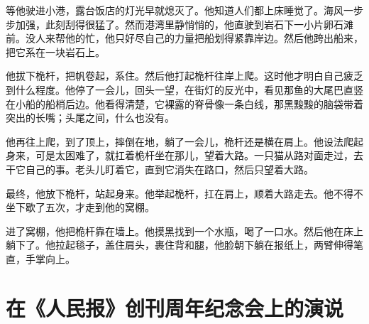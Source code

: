 \documentclass[12pt,UTF-8,openany]{ctexbook}
\begin{document}
\begin{large}
    等他驶进小港，露台饭店的灯光早就熄灭了。他知道人们都上床睡觉了。海风一步步加强，此刻刮得很猛了。然而港湾里静悄悄的，他直驶到岩石下一小片卵石滩前。没人来帮他的忙，他只好尽自己的力量把船划得紧靠岸边。然后他跨出船来，把它系在一块岩石上。
    
    他拔下桅杆，把帆卷起，系住。然后他打起桅杆往岸上爬。这时他才明白自己疲乏到什么程度。他停了一会儿，回头一望，在街灯的反光中，看见那鱼的大尾巴直竖在小船的船梢后边。他看得清楚，它裸露的脊骨像一条白线，那黑黢黢的脑袋带着突出的长嘴；头尾之间，什么也没有。
    
    他再往上爬，到了顶上，摔倒在地，躺了一会儿，桅杆还是横在肩上。他设法爬起身来，可是太困难了，就扛着桅杆坐在那儿，望着大路。一只猫从路对面走过，去干它自己的事。老头儿盯着它，直到它消失在路口，然后只望着大路。
    
    最终，他放下桅杆，站起身来。他举起桅杆，扛在肩上，顺着大路走去。他不得不坐下歇了五次，才走到他的窝棚。
    
    进了窝棚，他把桅杆靠在墙上。他摸黑找到一个水瓶，喝了一口水。然后他在床上躺下了。他拉起毯子，盖住肩头，裹住背和腿，他脸朝下躺在报纸上，两臂伸得笔直，手掌向上。
    
\end{large}



\chapter{在《人民报》创刊周年纪念会上的演说}
\end{document}
